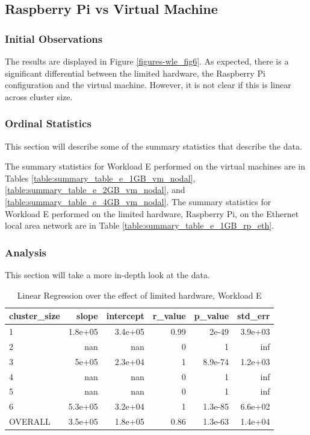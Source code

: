 \subsection{Raspberry Pi vs Virtual Machine}
\subsubsection{Initial Observations}
The results are displayed in Figure \ref{figures-wle_fig6}.  As expected, there is a significant differential between the limited hardware, the Raspberry Pi configuration and the virtual machine.  However, it is not clear if this is linear across cluster size. 

\subsubsection{Ordinal Statistics}
This section will describe some of the summary statistics that describe the data.  

The summary statistics for Workload E performed on the virtual machines are in Tables \ref{table:summary_table_e_1GB_vm_nodal}, \ref{table:summary_table_e_2GB_vm_nodal}, and \ref{table:summary_table_e_4GB_vm_nodal}.
The summary statistics for Workload E performed on the limited hardware, Raspberry Pi, on the Ethernet local area network are in Table \ref{table:summary_table_e_1GB_rp_eth}.



\subsubsection{Analysis}
This section will take a more in-depth look at the data.




\begin{table}[H]
\centering
\begin{tabular}{lrrrrr}
\toprule
cluster\_size &   slope &  intercept &  r\_value &  p\_value &  std\_err \\
\midrule
           1 & 1.8e+05 &    3.4e+05 &     0.99 &    2e-49 &  3.9e+03 \\
           2 &     nan &        nan &        0 &        1 &      inf \\
           3 &   5e+05 &    2.3e+04 &        1 &  8.9e-74 &  1.2e+03 \\
           4 &     nan &        nan &        0 &        1 &      inf \\
           5 &     nan &        nan &        0 &        1 &      inf \\
           6 & 5.3e+05 &    3.2e+04 &        1 &  1.3e-85 &  6.6e+02 \\
     OVERALL & 3.5e+05 &    1.8e+05 &     0.86 &  1.3e-63 &  1.4e+04 \\
\bottomrule
\end{tabular}
\caption{Linear Regression over the effect of limited hardware, Workload E}
\label{table:rp_v_vm_e}
\end{table}





